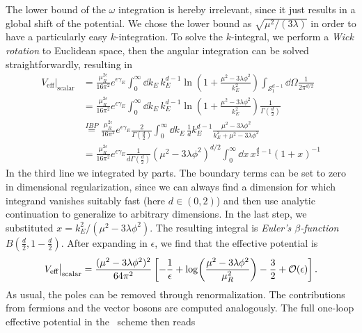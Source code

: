 The lower bound of the $\omega$ integration is hereby irrelevant, since it just results in a global shift of the potential. We chose the lower bound as $\sqrt{\mu^2/(3 \lambda)}$ in order to have a particularly easy $k$-integration. To solve the $k$-integral, we perform a \textit{Wick rotation} to Euclidean space, then the angular integration can be solved straightforwardly, resulting in
\begin{equation}
\begin{split}
V_\text{eff}\big \vert_{\text{scalar}} &= \frac{\mu_R^{2 \epsilon}}{16 \pi^2} e^{\epsilon \gamma_E} \int_0^\infty \dd k_E\, k_E^{d - 1}\ln\! \left(1 + \frac{\mu^2 - 3 \lambda \phi^2}{k_E^2} \right) \int_{\mathcal{S}_1^{d - 1}} \dd \Omega \frac{1}{2 \pi^{d/2}}  \\
& = \frac{\mu_R^{2 \epsilon}}{16 \pi^2} e^{\epsilon \gamma_E} \int_0^\infty \dd k_E\, k_E^{d - 1} \ln\! \left(1 + \frac{\mu^2 - 3 \lambda \phi^2}{k_E^2} \right) \frac{1}{\Gamma\! \left(\frac{d}{2} \right)} \\
&\stackrel{IBP}{=}  \frac{\mu_R^{2 \epsilon}}{16 \pi^2} e^{\epsilon \gamma_E} \frac{2}{\Gamma\! \left(\frac{d}{2} \right)} \int_0^\infty \dd k_E\, \frac{1}{d} k_E^{d - 1} \frac{\mu^2 - 3 \lambda \phi^2}{k_E^2 + \mu^2 - 3 \lambda \phi^2} \\
& =  \frac{\mu_R^{2 \epsilon}}{16 \pi^2} e^{\epsilon \gamma_E} \frac{1}{d \Gamma\! \left(\frac{d}{2} \right)} \left(\mu^2 - 3 \lambda \phi^2 \right)^{d/2} \int_0^\infty \dd x\, x^{\frac{d}{2} - 1} (1 + x)^{-1}
\end{split}
\end{equation}
In the third line we integrated by parts. The boundary terms can be set to zero in dimensional regularization, since we can always find a dimension for which integrand vanishes suitably fast (here $d \in (0, 2)$) and then use analytic continuation to generalize to arbitrary dimensions. In the last step, we substituted $x = k_E^2/(\mu^2 - 3 \lambda \phi^2)$. The resulting integral is \textit{Euler's $\beta$-function} $B\left(\frac{d}{2}, 1 - \frac{d}{2} \right)$. After expanding in $\epsilon$, we find that the effective potential is
\begin{equation}
V_{\text{eff}}\big \vert_{\text{scalar}} = \frac{(\mu^2 - 3 \lambda \phi^2)^2}{64 \pi^2} \left[ - \frac{1}{\epsilon} + \log\! \left( \frac{\mu^2 - 3 \lambda \phi^2}{\mu_R^2} \right) - \frac{3}{2} + \mathcal{O}\!\left(\epsilon\right) \right].
\end{equation}
As usual, the poles can be removed through renormalization. The contributions from fermions and the vector bosons are computed analogously. The full one-loop effective potential in the \MS\ scheme then reads
